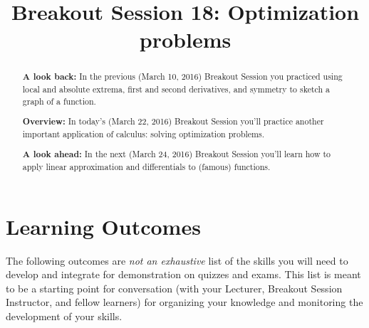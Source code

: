 \documentclass[handout,nooutcomes]{ximera}
\title{Breakout Session 18: Optimization problems}
\begin{document}
\begin{abstract}
  \textbf{A look back:} In the previous (March 10, 2016) Breakout Session you practiced using local and absolute extrema, first and second derivatives, and symmetry to sketch a graph of a function.

  \textbf{Overview:} In today's (March 22, 2016) Breakout Session you'll practice another important application of calculus: solving optimization problems.
  
  \textbf{A look ahead:} In the next (March 24, 2016) Breakout Session you'll learn how to apply linear approximation and differentials to (famous) functions.
\end{abstract}
\maketitle

\section{Learning Outcomes}
\label{section:learning-outcomes}
The following outcomes are \emph{not an exhaustive} list of the skills you will need to develop and integrate for demonstration on quizzes and exams.
This list is meant to be a starting point for conversation (with your Lecturer, Breakout Session Instructor, and fellow learners) for organizing your knowledge and monitoring the development of your skills.
\end{document}
